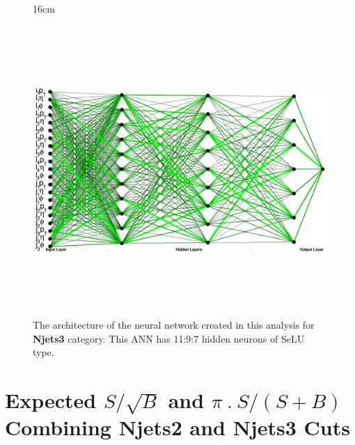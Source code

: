 \begin{figure}[H!]{16cm}
	\caption{The architecture of the neural network created in this analysis for \textbf{Njets3} category. This ANN has 11:9:7 hidden neurons of SeLU type.}
	\includegraphics[width=18cm,height=11cm,angle=90]{ChapterAnalysis/figs/k24nj3_architecture_horizontal}
\end{figure}

\chapter{Expected $S/\sqrt{B}$ and $\pi~.~S/(S+B)$ Combining Njets2 and Njets3 Cuts}
\label{app:significance_cutting_NNs}

